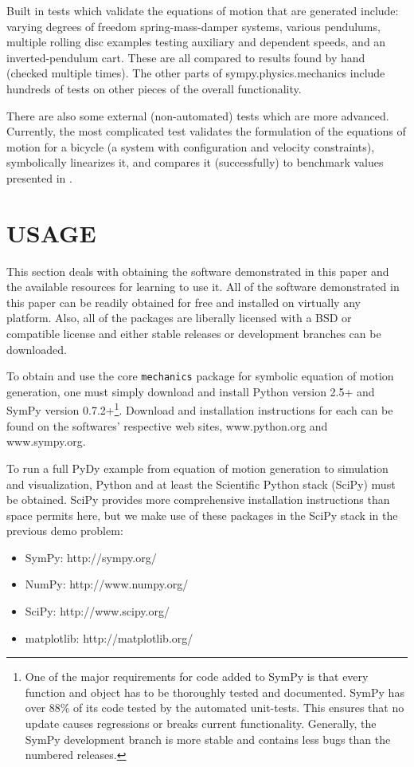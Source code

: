 \documentclass[twocolumn,10pt]{asme2e}
\begin{document}
Built in tests which validate the equations of motion that are generated
include: varying degrees of freedom spring-mass-damper systems, various
pendulums, multiple rolling disc examples testing auxiliary and dependent
speeds, and an inverted-pendulum cart. These are all compared to results found
by hand (checked multiple times). The other parts of sympy.physics.mechanics
include hundreds of tests on other pieces of the overall functionality.

There are also some external (non-automated) tests which are more advanced.
Currently, the most complicated test validates the formulation of the equations
of motion for a bicycle (a system with configuration and velocity constraints),
symbolically linearizes it, and compares it (successfully) to benchmark values
presented in \cite{Meijaard2007}.

\section*{USAGE}
This section deals with obtaining the software demonstrated in this paper and
the available resources for learning to use it. All of the software
demonstrated in this paper can be readily obtained for free and installed on
virtually any platform. Also, all of the packages are liberally licensed with a
BSD or compatible license and either stable releases or development branches
can be downloaded.

To obtain and use the core \verb|mechanics| package for symbolic equation of
motion generation, one must simply download and install Python version 2.5+ and
SymPy version 0.7.2+\footnote{One of the major requirements for code added to
SymPy is that every function and object has to be thoroughly tested and
documented. SymPy has over 88\% of its code tested by the automated unit-tests.
This ensures that no update causes regressions or breaks current functionality.
Generally, the SymPy development branch is more stable and contains less bugs
than the numbered releases.}. Download and installation instructions for each
can be found on the softwares' respective web sites, www.python.org and
www.sympy.org.

To run a full PyDy example from equation of motion generation to simulation and
visualization, Python and at least the Scientific Python stack (SciPy)
\cite{SciPyStackGithub} must be obtained. SciPy provides more comprehensive
installation instructions than space permits here, but we make use of these
packages in the SciPy stack in the previous demo problem:
%
\begin{itemize}
  \item SymPy: http://sympy.org/
  \item NumPy: http://www.numpy.org/
  \item SciPy: http://www.scipy.org/
  \item matplotlib: http://matplotlib.org/
\end{itemize}
\end{document}

